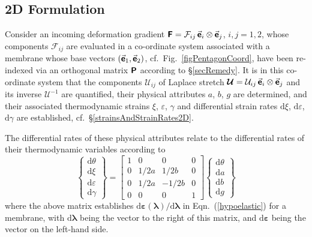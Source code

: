\subsection{2D Formulation}

Consider an incoming deformation gradient $\boldsymbol{\mathsf{F}} = \mathcal{F}_{ij} \, \vec{\boldsymbol{\mathsf{e}}}_i \otimes \vec{\boldsymbol{\mathsf{e}}}_j$, $i, j = 1, 2$, whose components $\mathcal{F}_{ij}$ are evaluated in a co-ordinate system associated with a membrane whose base vectors $( \vec{\boldsymbol{\mathsf{e}}}_1 , \vec{\boldsymbol{\mathsf{e}}}_2 )$, cf.\ Fig.~\ref{figPentagonCoord}, have been re-indexed via an orthogonal matrix $\boldsymbol{\mathsf{P}}$ according to \S\ref{secRemedy}.  It is in this co-ordinate system that the components $\mathcal{U}_{ij}$ of Laplace stretch $\boldsymbol{\mathcal{U}} = \mathcal{U}_{ij} \, \vec{\boldsymbol{\mathsf{e}}}_i \otimes \vec{\boldsymbol{\mathsf{e}}}_j$ and its inverse $\boldsymbol{\mathcal{U}}^{-1}$ are quantified, their physical attributes $a$, $b$, $g$ are determined, and their associated thermo\-dynamic strains $\xi$, $\varepsilon$, $\gamma$ and differential strain rates $\mathrm{d} \xi$, $\mathrm{d} \varepsilon$, $\mathrm{d} \gamma$ are established, cf.\ \S\ref{strainsAndStrainRates2D}.

The differential rates of these physical attributes relate to the differential rates of their thermo\-dynamic variables according to 
\begin{equation}
    \left\{ \begin{matrix}
    \mathrm{d} \theta \\ \mathrm{d} \xi \\
    \mathrm{d} \varepsilon \\ \mathrm{d} \gamma
    \end{matrix} \right\} = \begin{bmatrix}
    1 & 0 & 0 & 0 \\
    0 & 1/2a & 1/2b & 0 \\
    0 & 1/2a & -1/2b & 0 \\
    0 & 0 & 0 & 1
    \end{bmatrix} \left\{ \begin{matrix} 
    \mathrm{d} \theta \\ \mathrm{d} a \\
    \mathrm{d} b \\ \mathrm{d} g
    \end{matrix} \right\}
\end{equation}
where the above matrix establishes $\mathrm{d} \boldsymbol{\varepsilon} ( \boldsymbol{\lambda} ) / \mathrm{d} \boldsymbol{\lambda}$ in Eqn.~(\ref{hypoelastic}) for a membrane, with $\mathrm{d} \boldsymbol{\lambda}$ being the vector to the right of this matrix, and $\mathrm{d} \boldsymbol{\varepsilon}$ being the vector on the left-hand side.

